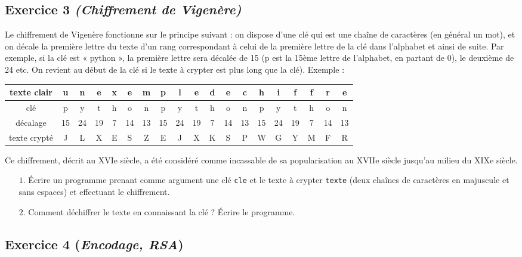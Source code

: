 \documentclass[11pt,a4paper]{article}
\begin{document}
\subsection*{Exercice 3 \textit{(Chiffrement de Vigenère)}}
Le chiffrement de Vigenère fonctionne sur le principe suivant : on dispose d'une clé qui est une chaîne de caractères (en général un mot), et on décale la première lettre du texte d'un rang correspondant à celui de la première lettre de la clé dans l'alphabet et ainsi de suite. Par exemple, si la clé est « python », la première
lettre sera décalée de 15 (p est la 15ème lettre de l'alphabet, en partant de 0), le deuxième de 24 etc. On
revient au début de la clé si le texte à crypter est plus long que la clé).
Exemple :
\begin{tabular}{|c|| c|c|c|c|c|c|c|c|c|c|c|c|c|c|c|c|c|c|}
\hline
texte clair &  u & n&  e & x&  e&  m&  p&  l&  e&  d&  e&  c&  h&  i&  f&  f&  r&  e \\
\hline
clé&  p&  y&  t& h&  o&  n&  p&  y&  t&  h&  o&  n&  p&  y&  t&  h&  o&  n \\
\hline
décalage &  15&  24&  19&  7&  14&  13&  15&  24&  19&  7 & 14 &  13&  15&  24&  19&  7&  14&  13 \\
\hline
texte crypté &  J &  L &  X &  E &  S &  Z  &  E &  J  & X  & K  & S  & P &  W &  G &  Y  & M  & F  & R  \\
\hline
\end{tabular}

Ce chiffrement, décrit au XVIe siècle, a été considéré comme incassable de sa popularisation au XVIIe siècle
jusqu’au milieu du XIXe siècle.


\begin{itemize}
\item[$1.$] Écrire un programme prenant comme argument une clé \texttt{cle} et le texte à crypter \texttt{texte} (deux
chaînes de caractères en majuscule et sans espaces) et effectuant le chiffrement.
\item[$2.$] Comment déchiffrer le texte en connaissant la clé ? Écrire le programme.
\end{itemize}



\subsection*{Exercice 4 (\textit{Encodage, RSA})}
\end{document}
